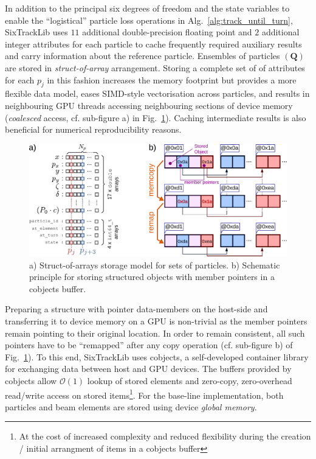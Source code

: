 \documentclass[a4paper,
               refpage,       %
               keeplastbox,   %
               ]{jacow}
\begin{document}
In addition to the principal six degrees of freedom and the state variables to enable the ``logistical'' particle loss operations in Alg.~\ref{alg:track_until_turn}, SixTrackLib uses $11$ additional double-precision floating point and $2$ additional integer attributes for each particle to cache frequently required auxiliary results and carry information about the reference particle. Ensembles of particles $\left(\mathbf{Q}\right)$ are stored in \textit{struct-of-array} arrangement. Storing a  complete set of of attributes for each $p_j$ in this fashion increases the memory footprint but provides a more flexible data model, eases SIMD-style vectorisation across particles, and results in neighbouring GPU threads accessing neighbouring sections of device memory (\textit{coalesced} access, cf. sub-figure a) in Fig.~\ref{fig:cobjects}). Caching intermediate results is also beneficial for numerical reproducibility reasons.
\begin{figure}[!hbt]
    \centering
    \includegraphics*[width=.95\columnwidth]{THPAB190_f2}
    \caption{a) Struct-of-arrays storage model for sets of particles. b) Schematic principle for storing structured objects with member pointers in a cobjects buffer.}
    \label{fig:cobjects}
\end{figure}
Preparing a structure with pointer data-members on the host-side and transferring it to device memory on a GPU is non-trivial as the member pointers remain pointing to their original location. In order to remain consistent, all such pointers have to be ``remapped'' after any copy operation (cf. sub-figure b) of Fig.~\ref{fig:cobjects}). To this end, SixTrackLib uses cobjects\cite{cobjects-repo-2021}, a self-developed container library for exchanging data between host and GPU devices. The buffers provided by cobjects allow $\mathcal{O}(1)$ lookup of stored elements and zero-copy, zero-overhead read/write access on stored items\footnote{At the cost of increased complexity and reduced flexibility during the creation / initial arrangment of items in a cobjects buffer}. For the base-line implementation, both particles and beam elements are stored using device \textit{global memory}.
\end{document}
